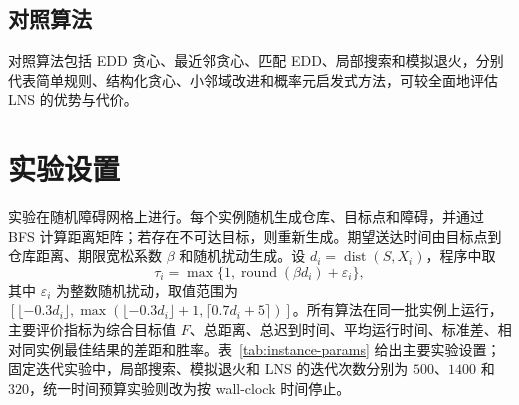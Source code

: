 \documentclass[11pt,a4paper]{ctexart}
\begin{document}
\subsection{对照算法}

\indent 对照算法包括 EDD 贪心、最近邻贪心、匹配 EDD、局部搜索和模拟退火，分别代表简单规则、结构化贪心、小邻域改进和概率元启发式方法，可较全面地评估 LNS 的优势与代价。


\section{实验设置}

\indent 实验在随机障碍网格上进行。每个实例随机生成仓库、目标点和障碍，并通过 BFS 计算距离矩阵；若存在不可达目标，则重新生成。期望送达时间由目标点到仓库距离、期限宽松系数 $\beta$ 和随机扰动生成。设 $d_i=\operatorname{dist}(S,X_i)$，程序中取
\[
\tau_i=\max\{1,\operatorname{round}(\beta d_i)+\varepsilon_i\},
\]
其中 $\varepsilon_i$ 为整数随机扰动，取值范围为 $[\lfloor -0.3d_i\rfloor,\max(\lfloor -0.3d_i\rfloor+1,\lceil 0.7d_i+5\rceil)]$。所有算法在同一批实例上运行，主要评价指标为综合目标值 $F$、总距离、总迟到时间、平均运行时间、标准差、相对同实例最佳结果的差距和胜率。表~\ref{tab:instance-params} 给出主要实验设置；固定迭代实验中，局部搜索、模拟退火和 LNS 的迭代次数分别为 $500$、$1400$ 和 $320$，统一时间预算实验则改为按 wall-clock 时间停止。
\end{document}

